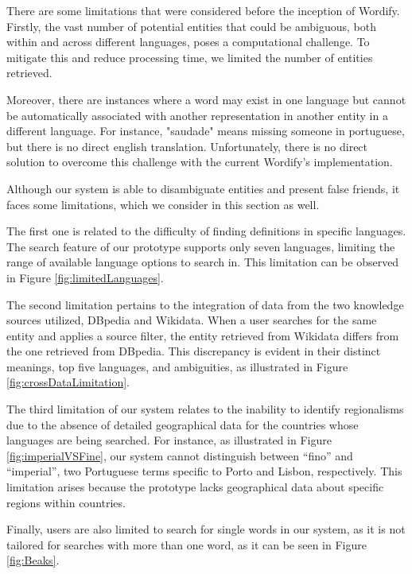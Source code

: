 \documentclass[twocolumn,twoside,11pt,a4paper]{article}
\begin{document}
There are some limitations that were considered before the inception of Wordify. Firstly, the vast number of potential entities that could be ambiguous, both within and across different languages, poses a computational challenge. To mitigate this and reduce processing time, we limited the number of entities retrieved.

Moreover, there are instances where a word may exist in one language but cannot be automatically associated with another representation in another entity in a different language. For instance, "saudade" means missing someone in portuguese, but there is no direct english translation. Unfortunately, there is no direct solution to overcome this challenge with the current Wordify's implementation.

Although our system is able to disambiguate entities and present false friends, it faces some limitations, which we consider in this section as well.

The first one is related to the difficulty of finding definitions in specific languages. The search feature of our prototype supports only seven languages, limiting the range of available language options to search in. This limitation can be observed in Figure \ref{fig:limitedLanguages}.

The second limitation pertains to the integration of data from the two knowledge sources utilized, DBpedia and Wikidata. When a user searches for the same entity and applies a source filter, the entity retrieved from Wikidata differs from the one retrieved from DBpedia. This discrepancy is evident in their distinct meanings, top five languages, and ambiguities, as illustrated in Figure \ref{fig:crossDataLimitation}.

The third limitation of our system relates to the inability to identify regionalisms due to the absence of detailed geographical data for the countries whose languages are being searched. For instance, as illustrated in Figure \ref{fig:imperialVSFine}, our system cannot distinguish between ``fino'' and ``imperial'', two Portuguese terms specific to Porto and Lisbon, respectively. This limitation arises because the prototype lacks geographical data about specific regions within countries.

Finally, users are also limited to search for single words in our system, as it is not tailored for searches with more than one word, as it can be seen in Figure \ref{fig:Beaks}.

\end{document}
